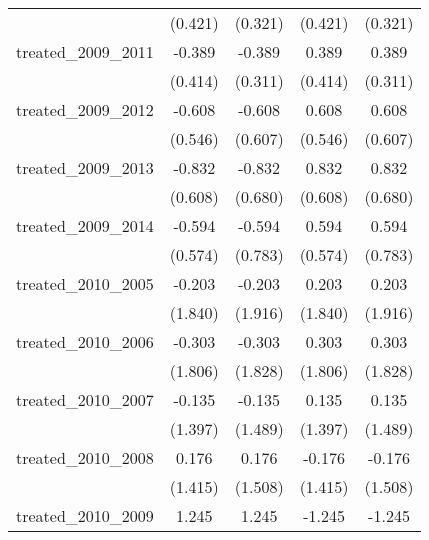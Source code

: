 {\begin{tabular}{l*{4}{c}}
            &     (0.421)         &     (0.321)         &     (0.421)         &     (0.321)         \\
[1em]
treated\_2009\_2011&      -0.389         &      -0.389         &       0.389         &       0.389         \\
            &     (0.414)         &     (0.311)         &     (0.414)         &     (0.311)         \\
[1em]
treated\_2009\_2012&      -0.608         &      -0.608         &       0.608         &       0.608         \\
            &     (0.546)         &     (0.607)         &     (0.546)         &     (0.607)         \\
[1em]
treated\_2009\_2013&      -0.832         &      -0.832         &       0.832         &       0.832         \\
            &     (0.608)         &     (0.680)         &     (0.608)         &     (0.680)         \\
[1em]
treated\_2009\_2014&      -0.594         &      -0.594         &       0.594         &       0.594         \\
            &     (0.574)         &     (0.783)         &     (0.574)         &     (0.783)         \\
[1em]
treated\_2010\_2005&      -0.203         &      -0.203         &       0.203         &       0.203         \\
            &     (1.840)         &     (1.916)         &     (1.840)         &     (1.916)         \\
[1em]
treated\_2010\_2006&      -0.303         &      -0.303         &       0.303         &       0.303         \\
            &     (1.806)         &     (1.828)         &     (1.806)         &     (1.828)         \\
[1em]
treated\_2010\_2007&      -0.135         &      -0.135         &       0.135         &       0.135         \\
            &     (1.397)         &     (1.489)         &     (1.397)         &     (1.489)         \\
[1em]
treated\_2010\_2008&       0.176         &       0.176         &      -0.176         &      -0.176         \\
            &     (1.415)         &     (1.508)         &     (1.415)         &     (1.508)         \\
[1em]
treated\_2010\_2009&       1.245\sym{*}  &       1.245         &      -1.245\sym{*}  &      -1.245         \\

\end{tabular}}
